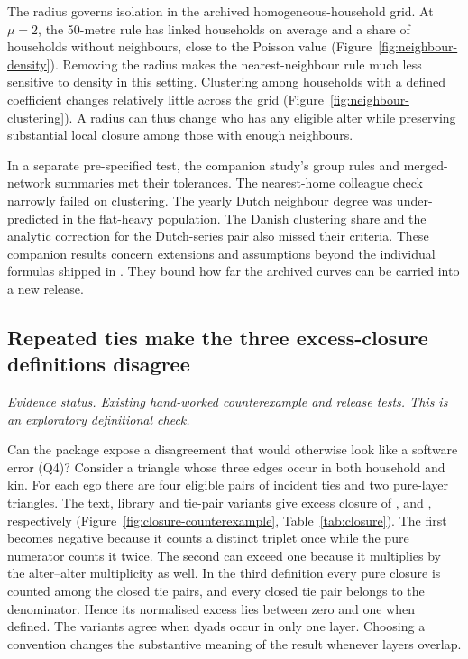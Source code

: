 The radius governs isolation in the archived homogeneous-household grid. At $\mu=2$, the 50-metre rule has \NeighbourTwoDegree{} linked households on average and a \NeighbourTwoNone{} share of households without neighbours, close to the Poisson value \NeighbourTwoPoisson{} (Figure~\ref{fig:neighbour-density}). Removing the radius makes the nearest-neighbour rule much less sensitive to density in this setting. Clustering among households with a defined coefficient changes relatively little across the grid (Figure~\ref{fig:neighbour-clustering}). A radius can thus change who has any eligible alter while preserving substantial local closure among those with enough neighbours.

In a separate pre-specified test, the companion study's group rules and merged-network summaries met their tolerances. The nearest-home colleague check narrowly failed on clustering. The yearly Dutch neighbour degree was under-predicted in the flat-heavy population. The Danish clustering share and the analytic correction for the Dutch-series pair also missed their criteria. These companion results concern extensions and assumptions beyond the individual formulas shipped in \builtnet{} \citep{almamunpredicting2026}. They bound how far the archived curves can be carried into a new release.

\subsection{Repeated ties make the three excess-closure definitions disagree}
\label{res:closure}
\textit{Evidence status. Existing hand-worked counterexample and release tests. This is an exploratory definitional check.}

Can the package expose a disagreement that would otherwise look like a software error (Q4)? Consider a triangle whose three edges occur in both household and kin. For each ego there are four eligible pairs of incident ties and two pure-layer triangles. The text, library and tie-pair variants give excess closure of \ClosurePaper{}, \ClosureLibrary{} and \ClosureTiePair{}, respectively (Figure~\ref{fig:closure-counterexample}, Table~\ref{tab:closure}). The first becomes negative because it counts a distinct triplet once while the pure numerator counts it twice. The second can exceed one because it multiplies by the alter--alter multiplicity as well. In the third definition every pure closure is counted among the closed tie pairs, and every closed tie pair belongs to the denominator. Hence its normalised excess lies between zero and one when defined. The variants agree when dyads occur in only one layer. Choosing a convention changes the substantive meaning of the result whenever layers overlap.


